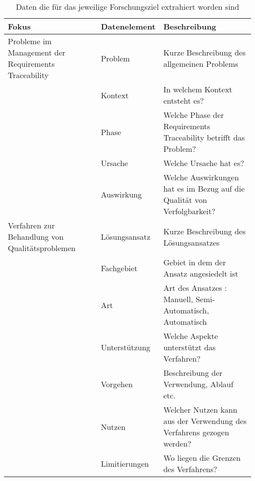\begin{table*}[!ht]
    \centering
    \begin{tabularx}{\textwidth}{ssX}
        \toprule
        Fokus & Datenelement & Beschreibung \\ \midrule
       Probleme im Management der Requirements Traceability & Problem & Kurze Beschreibung des allgemeinen Problems \\
        & Kontext & In welchem Kontext entsteht es? \\
        & Phase & Welche Phase der Requirements Traceability betrifft das Problem? \\
        & Ursache & Welche Ursache hat es?  \\
        & Auswirkung  & Welche Auswirkungen hat es im Bezug auf die Qualität von Verfolgbarkeit? \\
        Verfahren zur Behandlung von Qualitätsproblemen & Lösungsansatz & Kurze Beschreibung des Lösungsansatzes \\
        & Fachgebiet  & Gebiet in dem der Ansatz angesiedelt ist  \\
        & Art & Art des Ansatzes : Manuell, Semi-Automatisch, Automatisch \\
        & Unterstützung & Welche Aspekte unterstützt das Verfahren? \\
        & Vorgehen & Beschreibung der Verwendung, Ablauf etc. \\
        & Nutzen & Welcher Nutzen kann aus der Verwendung des Verfahrens gezogen werden? \\
        & Limitierungen & Wo liegen die Grenzen des Verfahrens? \\
    \bottomrule
    \end{tabularx}
    \caption{Daten die für das jeweilige Forschungsziel extrahiert worden sind}
    \label{tab:dataextraction_special}
\end{table*}


